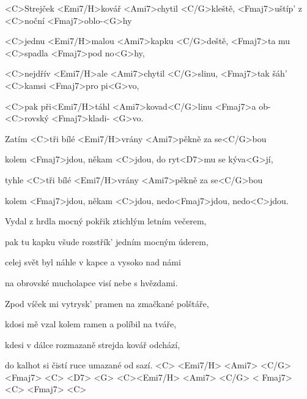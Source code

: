 

\zs
<C>Strejček <Emi7/H>kovář <Ami7>chytil <C/G>kleště, 
<Fmaj7>uštíp' z <C>noční <Fmaj7>oblo-<G>hy

<C>jednu <Emi7/H>malou <Ami7>kapku <C/G>deště, 
<Fmaj7>ta mu <C>spadla <Fmaj7>pod no<G>hy,

<C>nejdřív <Emi7/H>ale <Ami7>chytil <C/G>slinu, 
<Fmaj7>tak šáh' <C>kamsi <Fmaj7>pro pi<G>vo,

<C>pak při<Emi7/H>táhl <Ami7>kovad<C/G>linu <Fmaj7>a 
ob-<C>rovský <Fmaj7>kladi- <G>vo.
\ks

\zr
Zatím <C>tři bílé <Emi7/H>vrány <Ami7>pěkně za se<C/G>bou

kolem <Fmaj7>jdou, někam <C>jdou, do ryt<D7>mu se 
kýva<G>jí,

tyhle <C>tři bílé <Emi7/H>vrány <Ami7>pěkně za se<C/G>bou

kolem <Fmaj7>jdou, někam <C>jdou, nedo<Fmaj7>jdou, 
nedo<C>jdou.
\kr

\zs
Vydal z hrdla mocný pokřik ztichlým letním večerem,

pak tu kapku všude rozstřík' jedním mocným úderem,

celej svět byl náhle v kapce a vysoko nad námi

na obrovské mucholapce visí nebe s hvězdami.
\ks

\zr \kr

\zs
Zpod víček mi vytrysk' pramen na zmačkané polštáře,

kdosi mě vzal kolem ramen a políbil na tváře,

kdesi v dálce rozmazaně strejda kovář odchází,

do kalhot si čistí ruce umazané od sazí.
\ks
<C> <Emi7/H> <Ami7> <C/G> <Fmaj7> <C> <D7> <G> <C><Emi7/H> <Ami7> <C/G> < Fmaj7> <C> <Fmaj7> <C>


\kp






